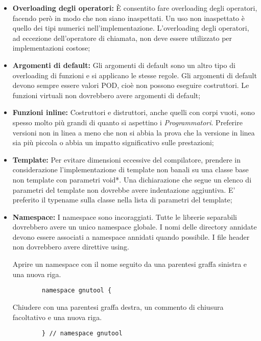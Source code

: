 \documentclass[../NomeDocumento.tex]{subfiles}
\begin{document}
\begin{itemize}
		\item \textbf{Overloading degli operatori:} È consentito fare overloading degli operatori, facendo però in modo che non siano inaspettati. Un uso non inaspettato è quello dei tipi numerici nell'implementazione. L'overloading degli operatori, ad eccezione dell'operatore di chiamata, non deve essere utilizzato per implementazioni costose;
		
		\item \textbf{Argomenti di default:} Gli argomenti di default sono un altro tipo di overloading di funzioni e si applicano le stesse regole. Gli argomenti di default devono sempre essere valori POD, cioè non possono eseguire costruttori. Le funzioni virtuali non dovrebbero avere argomenti di default;
		
		\item \textbf{Funzioni inline:} Costruttori e distruttori, anche quelli con corpi vuoti, sono spesso molto più grandi di quanto si aspettino i \textit{Programmatori}. Preferire versioni non in linea a meno che non si abbia la prova che la versione in linea sia più piccola o abbia un impatto significativo sulle prestazioni;
		
		\item \textbf{Template:} Per evitare dimensioni eccessive del compilatore, prendere in considerazione l'implementazione di template non banali su una classe base non template con parametri void*.
		Una dichiarazione che segue un elenco di parametri del template non dovrebbe avere indentazione aggiuntiva.
		E' preferito il typename sulla classe nella lista di parametri del template;
		
		
		\item \textbf{Namespace:} I namespace sono incoraggiati. Tutte le librerie separabili dovrebbero avere un unico namespace globale. I nomi delle directory annidate devono essere associati a namespace annidati quando possibile.		
		I file header non dovrebbero avere direttive using.
		
		Aprire un namespace con il nome seguito da una parentesi graffa sinistra e una nuova riga.
		
		\begin{verbatim}
		namespace gnutool {
		\end{verbatim}
		
		Chiudere con una parentesi graffa destra, un commento di chiusura facoltativo e una nuova riga.		
		
		\begin{verbatim}
		} // namespace gnutool
		\end{verbatim}
		

\end{itemize}
\end{document}
